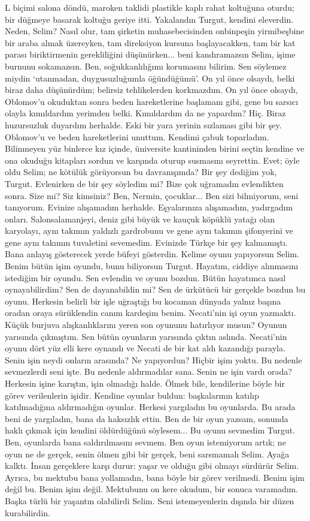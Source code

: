 \documentclass[a5paper,12pt]{scrbook}
\begin{document}
L biçimi salona döndü, maroken taklidi plastikle kaplı rahat koltuğuna oturdu;
bir düğmeye basarak koltuğu geriye itti. Yakalandın Turgut, kendini eleverdin.
Neden, Selim? Nasıl olur, tam şirketin muhasebecisinden onbinpeşin yirmibeşbine
bir araba almak üzereyken, tam direksiyon kursuna başlayacakken, tam bir kat
parası biriktirmenin gerekliliğini düşünürken... beni kandıramazsın Selim, işime
burnunu sokamazsın. Ben, soğukkanlılığımı korumasını bilirim. Sen söylemez
miydin `utanmadan, duygusuzluğumla öğündüğümü'. On yıl önce olsaydı, belki biraz
daha düşünürdüm; belirsiz tehlikelerden korkmazdım. On yıl önce olsaydı,
Oblomov'u okuduktan sonra beden hareketlerine başlamam gibi, gene bu sarsıcı
olayla kımıldardım yerimden belki. Kımıldardım da ne yapardım? Hiç. Biraz
huzursuzluk duyardım herhalde. Eski bir yara yerinin sızlaması gibi bir şey.
Oblomov'u ve beden hareketlerini unuttum. Kendimi çabuk toparladım. Bilinmeyen
yüz binlerce kız içinde, üniversite kantininden birini seçtin kendine ve ona
okuduğu kitapları sordun ve karşında oturup susmasını seyrettin. Evet; öyle oldu
Selim; ne kötülük görüyorsun bu davranışımda? Bir şey dediğim yok, Turgut.
Evlenirken de bir şey söyledim mi? Bize çok uğramadın evlendikten sonra. Size
mi? Siz kimsiniz? Ben, Nermin, çocuklar... Ben sizi bilmiyorum, seni tanıyorum.
Evinize alışamadım herhalde. Eşyalarınıza alışamadım, yadırgadım onları.
Salonsalamanjeyi, deniz gibi büyük ve kauçuk köpüklü yatağı olan karyolayı, aynı
takımın yaldızlı gardrobunu ve gene aynı takımın şifonyerini ve gene aynı
takımın tuvaletini sevemedim. Evinizde Türkçe bir şey kalmamıştı. Bana anlayış
gösterecek yerde büfeyi gösterdin. Kelime oyunu yapıyorsun Selim. Benim bütün
işim oyundu, bunu biliyorsun Turgut. Hayatım, ciddiye alınmasını istediğim bir
oyundu. Sen evlendin ve oyunu bozdun. Bütün hayatımca nasıl oynayabilirdim? Sen
de dayanabildin mi? Sen de ürkütücü bir gerçekle bozdun bu oyunu. Herkesin
belirli bir işle uğraştığı bu kocaman dünyada yalnız başına oradan oraya
sürüklendin canım kardeşim benim. Necati'nin işi oyun yazmaktı. Küçük burjuva
alışkanlıklarını yeren son oyununu hatırlıyor musun? Oyunun yarısında çıkmıştım.
Sen bütün oyunların yarısında çıktın aslında. Necati'nin oyunu dört yüz elli
kere oynandı ve Necati de bir kat aldı kazandığı parayla. Senin işin neydi
onların arasında? Ne yapıyordun? Hiçbir işim yoktu. Bu nedenle sevmezlerdi seni
işte. Bu nedenle aldırmadılar sana. Senin ne işin vardı orada? Herkesin işine
karıştın, işin olmadığı halde. Ölmek bile, kendilerine böyle bir görev
verilenlerin işidir. Kendine oyunlar buldun: başkalarının katılıp katılmadığına
aldırmadığın oyunlar. Herkesi yargıladın bu oyunlarda. Bu arada beni de
yargıladın, bana da haksızlık ettin. Ben de bir oyun yazsam, sonunda haklı
çıkmak için kendini öldürdüğünü söylesem... Bu oyunu sevmedim Turgut. Ben,
oyunlarda bana saldırılmasını sevmem. Ben oyun istemiyorum artık; ne oyun ne de
gerçek, senin ölmen gibi bir gerçek, beni sarsmamalı Selim. Ayağa kalktı. İnsan
gerçeklere karşı durur: yaşar ve olduğu gibi olmayı sürdürür Selim. Ayrıca, bu
mektubu bana yollamadın, bana böyle bir görev verilmedi. Benim işim değil bu.
Benim işim değil. Mektubunu on kere okudum, bir sonuca varamadım. Başka türlü
bir yaşantın olabilirdi Selim. Seni istemeyenlerin dışında bir düzen
kurabilirdin.
\end{document}
